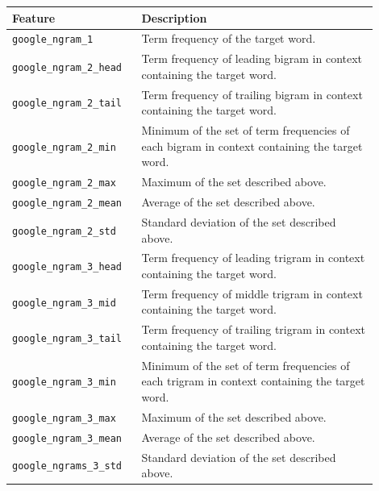 \documentclass{dcthesis}
\theoremstyle{definition}
\theoremstyle{remark}
\begin{document}
\begin{table}[H]
  \centering
  \begin{tabular}{>{\centering\arraybackslash}p{0.3\linewidth}>{\arraybackslash}p{0.6\linewidth}}
    \hline \textbf{Feature} & \textbf{Description} \\ \hline 
    \texttt{google\_ngram\_1} & Term frequency of the target word.\\
    \hline 
    \texttt{google\_ngram\_2\_head} & Term frequency of leading bigram in context containing the target word.\\
    \hline 
    \texttt{google\_ngram\_2\_tail} & Term frequency of trailing bigram in context containing the target word.\\
    \hline 
    \texttt{google\_ngram\_2\_min} & Minimum of the set of term frequencies of each bigram in context containing the target word.\\
    \hline 
    \texttt{google\_ngram\_2\_max} & Maximum of the set described above.\\
    \hline 
    \texttt{google\_ngram\_2\_mean} & Average of the set described above.\\
    \hline 
    \texttt{google\_ngram\_2\_std} & Standard deviation of the set described above.\\
    \hline 
    \texttt{google\_ngram\_3\_head} & Term frequency of leading trigram in context containing the target word.\\
    \hline 
    \texttt{google\_ngram\_3\_mid} & Term frequency of middle trigram in context containing the target word.\\
    \hline 
    \texttt{google\_ngram\_3\_tail} & Term frequency of trailing trigram in context containing the target word.\\
    \hline 
    \texttt{google\_ngram\_3\_min} & Minimum of the set of term frequencies of each trigram in context containing the target word.\\
    \hline 
    \texttt{google\_ngram\_3\_max} & Maximum of the set described above.\\
    \hline 
    \texttt{google\_ngram\_3\_mean} & Average of the set described above.\\
    \hline 
    \texttt{google\_ngrams\_3\_std} & Standard deviation of the set described above.\\
    \hline 
  \end{tabular}
  \label{word_frequency_and_n_gram_features_google_ngram_based}
\end{table}
\end{document}
